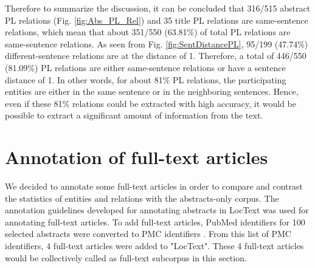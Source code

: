 
Therefore to summarize the discussion, it can be concluded that 316/515 abstract PL relations (Fig. \ref{fig:Abs_PL_Rel}) and 35 title PL relations are same-sentence relations, which mean that about 351/550 (63.81\%) of total PL relations are same-sentence relations. As seen from  Fig. \ref{fig:SentDistancePL}, 95/199 (47.74\%) different-sentence relations are at the distance of 1. Therefore, a total of 446/550 (81.09\%) PL relations are either same-sentence relations or have a sentence distance of 1. In other words, for about 81\% PL relations, the participating entities are either in the same sentence or in the neighboring sentences. Hence, even if these 81\% relations could be extracted with high accuracy, it would be possible to extract a significant amount of information from the text.

\section{Annotation of full-text articles} \label{sec:full-text}

We decided to annotate some full-text articles in order to compare and contrast the statistics of entities and relations with the abstracts-only corpus. The annotation guidelines developed for annotating abstracts in LocText was used for annotating full-text articles. To add full-text articles, PubMed identifiers for 100 selected abstracts were converted to PMC identifiers \cite{pubmedtopmc}. From this list of PMC identifiers, 4 full-text articles were added to "LocText". These 4 full-text articles would be collectively called as full-text subcorpus in this section.

